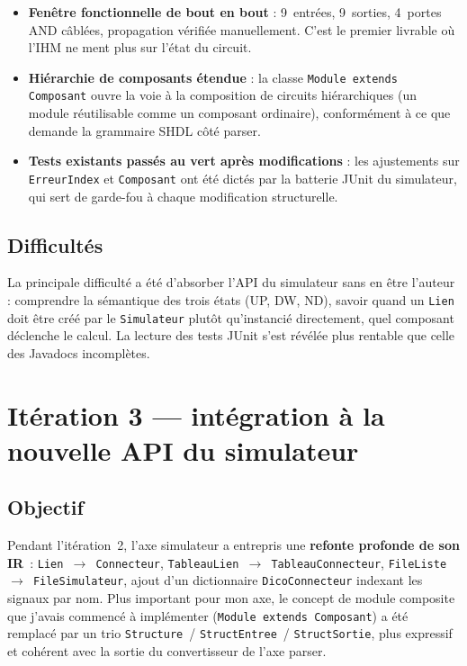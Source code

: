 \documentclass[11pt,a4paper]{article}
\begin{document}
\begin{itemize}
  \item \textbf{Fen\^etre fonctionnelle de bout en bout} : 9~entr\'ees, 9~sorties, 4~portes AND c\^abl\'ees, propagation v\'erifi\'ee manuellement. C'est le premier livrable o\`u l'IHM ne ment plus sur l'\'etat du circuit.
  \item \textbf{Hi\'erarchie de composants \'etendue} : la classe \texttt{Module extends Composant} ouvre la voie \`a la composition de circuits hi\'erarchiques (un module r\'eutilisable comme un composant ordinaire), conform\'ement \`a ce que demande la grammaire SHDL c\^ot\'e parser.
  \item \textbf{Tests existants pass\'es au vert apr\`es modifications} : les ajustements sur \texttt{ErreurIndex} et \texttt{Composant} ont \'et\'e dict\'es par la batterie JUnit du simulateur, qui sert de garde-fou \`a chaque modification structurelle.
\end{itemize}

\subsection*{Difficult\'es}

La principale difficult\'e a \'et\'e d'absorber l'API du simulateur sans en \^etre l'auteur : comprendre la s\'emantique des trois \'etats (UP, DW, ND), savoir quand un \texttt{Lien} doit \^etre cr\'e\'e par le \texttt{Simulateur} plut\^ot qu'instanci\'e directement, quel composant d\'eclenche le calcul. La lecture des tests JUnit s'est r\'ev\'el\'ee plus rentable que celle des Javadocs incompl\`etes.

\section{It\'eration 3 --- int\'egration \`a la nouvelle API du simulateur}

\subsection*{Objectif}

Pendant l'it\'eration~2, l'axe simulateur a entrepris une \textbf{refonte profonde de son IR}~: \texttt{Lien~$\to$~Connecteur}, \texttt{TableauLien~$\to$~TableauConnecteur}, \texttt{FileListe~$\to$~FileSimulateur}, ajout d'un dictionnaire \texttt{DicoConnecteur} indexant les signaux par nom. Plus important pour mon axe, le concept de \og module composite \fg{} que j'avais commenc\'e \`a impl\'ementer (\texttt{Module extends Composant}) a \'et\'e remplac\'e par un trio \texttt{Structure}~/ \texttt{StructEntree}~/ \texttt{StructSortie}, plus expressif et coh\'erent avec la sortie du convertisseur de l'axe parser.
\end{document}
